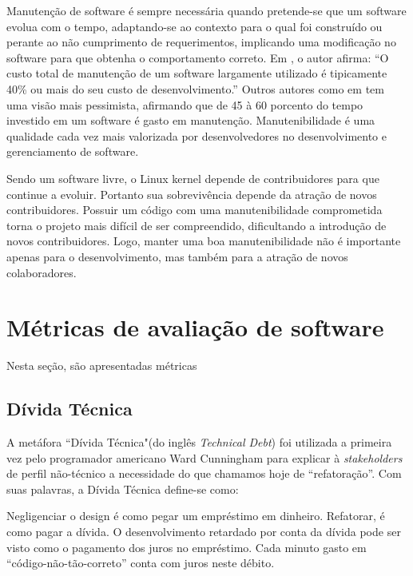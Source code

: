 Manutenção de software é sempre necessária quando pretende-se que
um software evolua com o tempo, adaptando-se ao contexto para o qual
foi construído ou perante ao não cumprimento de requerimentos, implicando
uma modificação no software para que obtenha o comportamento correto.
Em \cite{brooks1995mythical}, o autor afirma: ``O custo total de manutenção de um software largamente utilizado
é tipicamente 40\% ou mais do seu custo de desenvolvimento.''
Outros autores como em \cite{parikh1983tutorial}tem uma visão
mais pessimista, afirmando que de 45 à 60 porcento do tempo investido
em um software é gasto em manutenção. Manutenibilidade é uma qualidade
cada vez mais valorizada por desenvolvedores no desenvolvimento e
gerenciamento de software.

Sendo um software livre, o Linux kernel depende de contribuidores
para que continue a evoluir. Portanto sua sobrevivência depende da
atração de novos contribuidores\cite{crowston2012free}. Possuir um
código com uma manutenibilidade comprometida torna o projeto mais
difícil de ser compreendido, dificultando a introdução de novos contribuidores.
Logo, manter uma boa manutenibilidade não é importante apenas para
o desenvolvimento, mas também para a atração de novos colaboradores.


\section{Métricas de avaliação de software} \label {sec:softwareMetrics}
Nesta seção, são apresentadas métricas 
\subsection{Dívida Técnica}
A metáfora ``Dívida Técnica"(do inglês \textit{Technical Debt}) foi utilizada a primeira vez pelo programador americano Ward Cunningham para explicar à \textit{stakeholders} de perfil não-técnico a necessidade do que chamamos hoje de ``refatoração''\cite{cunningham1993wycash}. Com suas palavras, a Dívida Técnica define-se como: 
\begin{quoteAbnt} Negligenciar o design é como pegar um empréstimo em dinheiro. Refatorar, é como pagar a dívida. O desenvolvimento retardado por conta da dívida pode ser visto como o pagamento dos juros no empréstimo. Cada minuto gasto em ``código-não-tão-correto'' conta com juros neste débito.\end{quoteAbnt}

